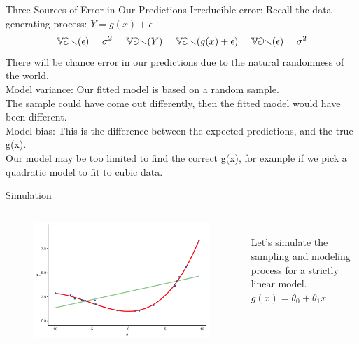 \documentclass[aspectratio=169]{../latex_main/tntbeamer}  %
\begin{document}
	
	\begin{frame}[c]{Three Sources of Error in Our Predictions}
	   Irreducible error: Recall the data generating process: $Y = g(x) + \epsilon$
	   \begin{equation*}
	       \mathbb{Var}(\epsilon) = \sigma^2 \hspace{5mm} \mathbb{Var}(Y) = \mathbb{Var}(g(x) + \epsilon) = \mathbb{Var}(\epsilon) = \sigma^2
	   \end{equation*}
	   There will be chance error in our predictions due to the natural randomness of the world.\\
	   \bigskip
	   Model variance: Our fitted model is based on a random sample.\\
        The sample could have come out differently, then the fitted model would have been different.\\
        \bigskip
        Model bias: This is the difference between the expected predictions, and the true g(x).\\
        Our model may be too limited to find the correct g(x), for example if we pick a quadratic model to fit to cubic data.

	\end{frame}
	
	
	\begin{frame}[c]{Simulation}
	  \begin{columns}
	      \begin{column}{.6\textwidth}
	           \begin{figure}
	               \includegraphics[scale=.5]{Bild9}
	           \end{figure} 
	      \end{column}
	      
	      \begin{column}{.4\textwidth}
	      \\
	      \bigskip
	      \bigskip
	      \bigskip
	            Let’s simulate the sampling and modeling process for a strictly linear model.\\
	            $g(x) = \theta_0 + \theta_1x$
	      \end{column}
	  \end{columns}
	\end{frame}
	
\end{document}
